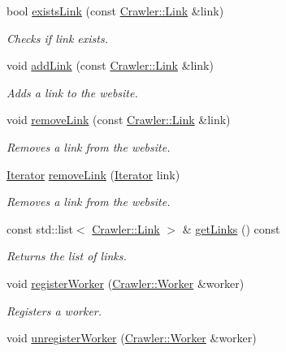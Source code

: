 \begin{DoxyCompactItemize}
bool \hyperlink{class_crawler_1_1_website_a6e59ad6594bee5c156c3fba3dd9567a0}{exists\+Link} (const \hyperlink{class_crawler_1_1_link}{Crawler\+::\+Link} \&link)
\begin{DoxyCompactList}\small\item\em Checks if link exists. \end{DoxyCompactList}\item 
void \hyperlink{class_crawler_1_1_website_ae329d422dadf492168d97e60d1665a50}{add\+Link} (const \hyperlink{class_crawler_1_1_link}{Crawler\+::\+Link} \&link)
\begin{DoxyCompactList}\small\item\em Adds a link to the website. \end{DoxyCompactList}\item 
void \hyperlink{class_crawler_1_1_website_a49c608507b8a9e5a9a61ab322218bc90}{remove\+Link} (const \hyperlink{class_crawler_1_1_link}{Crawler\+::\+Link} \&link)
\begin{DoxyCompactList}\small\item\em Removes a link from the website. \end{DoxyCompactList}\item 
\hyperlink{class_crawler_1_1_website_ad323c2cfd249fc9cd2692c00eb50c0c9}{Iterator} \hyperlink{class_crawler_1_1_website_a21cb582dcf6dd40a55201d0d72895aff}{remove\+Link} (\hyperlink{class_crawler_1_1_website_ad323c2cfd249fc9cd2692c00eb50c0c9}{Iterator} link)
\begin{DoxyCompactList}\small\item\em Removes a link from the website. \end{DoxyCompactList}\item 
const std\+::list$<$ \hyperlink{class_crawler_1_1_link}{Crawler\+::\+Link} $>$ \& \hyperlink{class_crawler_1_1_website_a34166a0d295179265b83f8fc7e20a01a}{get\+Links} () const 
\begin{DoxyCompactList}\small\item\em Returns the list of links. \end{DoxyCompactList}\item 
void \hyperlink{class_crawler_1_1_website_aea1eb836a63cd3a3a1060c0758858ce4}{register\+Worker} (\hyperlink{class_crawler_1_1_worker}{Crawler\+::\+Worker} \&worker)
\begin{DoxyCompactList}\small\item\em Registers a worker. \end{DoxyCompactList}\item 
void \hyperlink{class_crawler_1_1_website_a697612a26c11879c5b8d1555778778de}{unregister\+Worker} (\hyperlink{class_crawler_1_1_worker}{Crawler\+::\+Worker} \&worker)

\end{DoxyCompactItemize}
